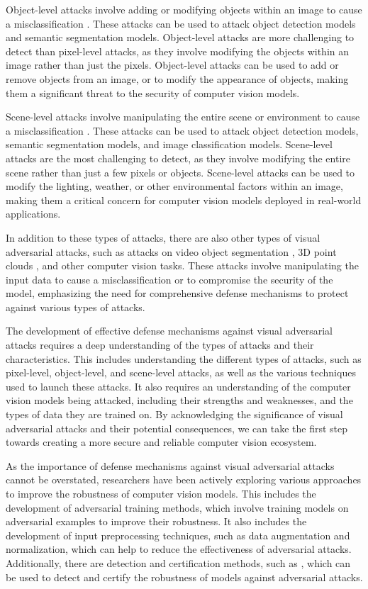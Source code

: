 \documentclass[11pt]{article}
\begin{document}
Object-level attacks involve adding or modifying objects within an image to cause a misclassification \cite{ref10}. These attacks can be used to attack object detection models and semantic segmentation models. Object-level attacks are more challenging to detect than pixel-level attacks, as they involve modifying the objects within an image rather than just the pixels. Object-level attacks can be used to add or remove objects from an image, or to modify the appearance of objects, making them a significant threat to the security of computer vision models.

Scene-level attacks involve manipulating the entire scene or environment to cause a misclassification \cite{ref11}. These attacks can be used to attack object detection models, semantic segmentation models, and image classification models. Scene-level attacks are the most challenging to detect, as they involve modifying the entire scene rather than just a few pixels or objects. Scene-level attacks can be used to modify the lighting, weather, or other environmental factors within an image, making them a critical concern for computer vision models deployed in real-world applications.

In addition to these types of attacks, there are also other types of visual adversarial attacks, such as attacks on video object segmentation \cite{ref12}, 3D point clouds \cite{ref13}, and other computer vision tasks. These attacks involve manipulating the input data to cause a misclassification or to compromise the security of the model, emphasizing the need for comprehensive defense mechanisms to protect against various types of attacks.

The development of effective defense mechanisms against visual adversarial attacks requires a deep understanding of the types of attacks and their characteristics. This includes understanding the different types of attacks, such as pixel-level, object-level, and scene-level attacks, as well as the various techniques used to launch these attacks. It also requires an understanding of the computer vision models being attacked, including their strengths and weaknesses, and the types of data they are trained on. By acknowledging the significance of visual adversarial attacks and their potential consequences, we can take the first step towards creating a more secure and reliable computer vision ecosystem.

As the importance of defense mechanisms against visual adversarial attacks cannot be overstated, researchers have been actively exploring various approaches to improve the robustness of computer vision models. This includes the development of adversarial training methods, which involve training models on adversarial examples to improve their robustness. It also includes the development of input preprocessing techniques, such as data augmentation and normalization, which can help to reduce the effectiveness of adversarial attacks. Additionally, there are detection and certification methods, such as \cite{ref14}, which can be used to detect and certify the robustness of models against adversarial attacks.
\end{document}
